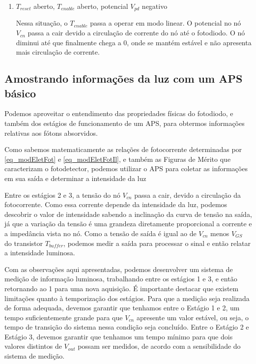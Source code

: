 \begin{enumerate}
\item \emph{$T_{reset}$} aberto, \emph{$T_{enable}$} aberto, potencial \emph{$V_{pd}$} negativo

Nessa situação, o $T_{enable}$ passa a operar em modo linear. O potencial no n\'o $V_{cn}$ passa a cair devido a circulação de corrente do n\'o at\'e o fotodiodo. O nó diminui at\'e que finalmente chega a 0, onde se mant\'em estável e não apresenta mais circula{\c c}\~ao de corrente.

\end{enumerate}

\subsection{Amostrando informações da luz com um APS básico}
\label{secao_amostrando}

Podemos aproveitar o entendimento das propriedades f\'isicas do fotodiodo, e tamb\'em dos est\'agios de funcionamento de um APS, para obtermos informações relativas aos f\'otons absorvidos.

Como sabemos matematicamente as relações de fotocorrente determinadas por \autoref{eq_modEletFot} e \autoref{eq_modEletFotIl}, e tamb\'em as Figuras de M\'erito que caracterizam o fotodetector, podemos utilizar o APS para coletar as informações em sua sa\'ida e determinar a intensidade da luz

Entre os est\'agios 2 e 3, a tens\~ao do n\'o $V_{cn}$ passa a cair, devido a circula{\c c}\~ao da fotocorrente. Como essa corrente depende da intensidade da luz, podemos descobrir o valor de intensidade sabendo a inclina{\c c}\~ao da curva de tens\~ao na sa\'ida, j\'a que a varia{\c c}\~ao da tens\~ao \'e uma grandeza diretamente proporcional a corrente e a imped\^ancia vista no n\'o. Como a tens\~ao de sa\'ida \'e igual ao de $V_{cn}$ menos $V_{GS}$ do transistor $T_{buffer}$, podemos medir a sa\'ida para processar o sinal e ent\~ao relatar a intensidade luminosa.

Com as observa{\c c}\~oes aqui apresentadas, podemos desenvolver um sistema de medi{\c c}\~ao de informa{\c c}\~ao luminosa, trabalhando entre os est\'agios 1 e 3, e ent\~ao retornando ao 1 para uma nova aquisi{\c c}\~ao. \'E importante destacar que existem limitações quanto \`a temporiza{\c c}\~ao dos est\'agios. Para que a medi{\c c}\~ao seja realizada de forma adequada, devemos garantir que tenhamos entre o Est\'agio 1 e 2, um tempo suficientemente grande para que $V_{cn}$ apresente um valor estável, ou seja, o tempo de transi{\c c}\~ao do sistema nessa condi{\c c}\~ao seja conclu\'ido. Entre o Est\'agio 2 e Est\'agio 3, devemos garantir que tenhamos um tempo mínimo para que dois valores distintos de $V_{out}$ possam ser medidos, de acordo com a sensibilidade do sistema de medi{\c c}\~ao.

